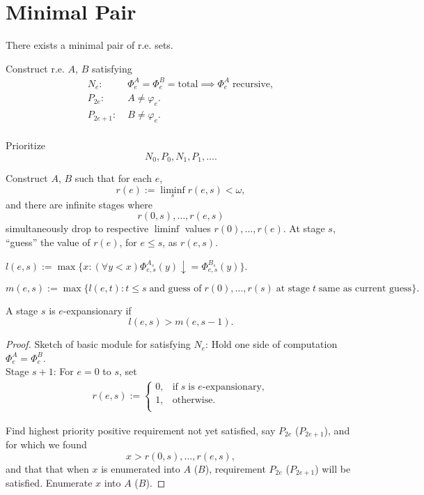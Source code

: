 \section{Minimal Pair}
  \begin{theorem}
    There exists a minimal pair of r.e. sets.
  \end{theorem}

  Construct r.e. $A$, $B$ satisfying
  \begin{align*}
    N_e: &\;\Phi_e^A=\Phi_e^B=\text{total} \implies \Phi_e^A\;
      \text{recursive},\\
    P_{2e}: &\;A\neq \varphi_e.\\
    P_{2e+1}: &\;B\neq \varphi_e.\\
  \end{align*}

  Prioritize
  \[N_0, P_0, N_1, P_1, \ldots.\]

  Construct $A$, $B$ such that for each $e$,
  \[r(e) :=\liminf_s r(e,s) <\omega,\]
  and there are infinite stages where
  \[r(0,s), \ldots, r(e,s)\]
  simultaneously drop to respective $\liminf$ values $r(0), \ldots, r(e)$.
  At stage $s$, ``guess'' the value of $r(e)$, for $e\leq s$, as $r(e,s)$.

  \begin{definition}
    $l(e,s) :=\max\{x: (\forall y<x) \Phi_{e,s}^{A_s}(y)
    \downarrow=\Phi_{e,s}^{B_s}(y)\}$.
  \end{definition}

  \begin{definition}
    \[m(e,s) := \max\{l(e,t): t\leq s\; \text{and guess of}\;
    r(0),\ldots,r(s)\; \text{at stage}\; t\; \text{same as current
    guess}\}.\]
  \end{definition}

  \begin{definition}
    A stage $s$ is $e$-expansionary if
    \[l(e,s) > m(e,s-1).\]
  \end{definition}

  \begin{proof}
    Sketch of basic module for satisfying $N_e$: Hold one side of
    computation $\Phi_e^A=\Phi_e^B$.\\

    Stage $s+1$: For $e=0$ to $s$, set
    \begin{align*}
      r(e,s) :=
      \begin{cases}
        0, &\text{if}\; s\; \text{is $e$-expansionary},\\
        1, &\text{otherwise}.\\
      \end{cases}
    \end{align*}

    Find highest priority positive requirement not yet satisfied, say
    $P_{2e}$ ($P_{2e+1}$), and for which we found
    \[x > r(0,s),\ldots,r(e,s),\]
    and that that when $x$ is enumerated into $A$ ($B$), requirement
    $P_{2e}$ ($P_{2e+1}$) will be satisfied. Enumerate $x$ into $A$ ($B$).
  \end{proof}

